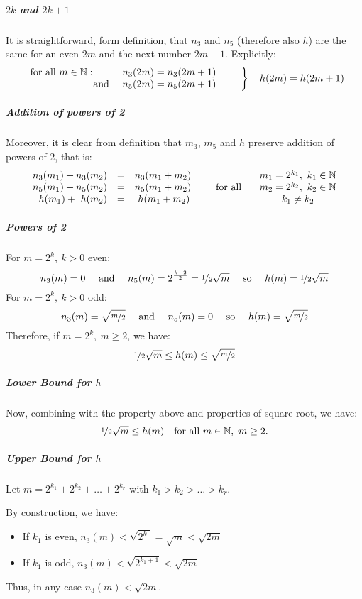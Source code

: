 \subparagraph{$2k$ and $2k+1$}
It is straightforward, form definition, that $n_3$ and $n_5$ (therefore also $h$) are the same for an even $2m$ and the next number $2m+1$.
Explicitly:
$$
\left. 
\begin{array}{rc}
	\text{for all } m \in \mathbb{N}: \qquad & n_3(2m) = n_3(2m+1) \\
	\text{ and } & n_5(2m) = n_5(2m+1) \\
\end{array} 
\qquad \right\rbrace \quad h(2m) = h(2m+1)
$$

\subparagraph{Addition of powers of 2}
Moreover, it is clear from definition that $m_3$, $m_5$ and $h$ preserve addition of powers of 2, that is:
$$
\begin{array}{rcl}
	n_3(m_1) + n_3(m_2) &=& n_3(m_1+m_2) \\
	n_5(m_1) + n_5(m_2) &=& n_5(m_1+m_2) \\
	  h(m_1) + \ h(m_2) &=& \ h(m_1+m_2) \\
\end{array}
\qquad \text{for all } \quad
\begin{array}{c}
	m_1=2^{k_1}, \ k_1 \in \mathbb{N} \\
	m_2=2^{k_2}, \ k_2 \in \mathbb{N} \\
	k_1 \neq k_2
\end{array}
$$

\subparagraph{Powers of 2}
For $m=2^k, \ k>0$ even: 
$$
n_3(m) = 0 
\quad \text{ and } \quad 
n_5(m) = 2^{\frac{k-2}{2}} = \nicefrac{1}{2}\sqrt{m}
\quad \text{ so } \quad 
h(m) = \nicefrac{1}{2}\sqrt{m} 
$$
For $m=2^k, \ k>0$ odd: 
$$
n_3(m) = \sqrt{\nicefrac{m}{2}}
\quad \text{ and } \quad 
n_5(m) = 0
\quad \text{ so } \quad 
h(m) = \sqrt{\nicefrac{m}{2}}
$$
Therefore, if $m=2^k, \ m \geq 2$, we have:
$$
\nicefrac{1}{2}\sqrt{m} \leq h(m) \leq \sqrt{\nicefrac{m}{2}}
$$

\subparagraph{Lower Bound for $h$}
Now, combining with the property above and properties of square root, we have:
$$
\nicefrac{1}{2}\sqrt{m} \leq h(m) \quad \text{for all } m \in \mathbb{N}, \ m \geq 2.
$$

\subparagraph{Upper Bound for $h$}
Let $m = 2^{k_1} + 2^{k_2} + \dots + 2^{k_r}$ with $k_1 > k_2 > \dots > k_r$.

By construction, we have:
\begin{itemize}
	\item If $k_1$ is even, $n_3(m) < \sqrt{2^{k_1}} = \sqrt{m} < \sqrt{2m}$
	\item If $k_1$ is odd, $n_3(m) < \sqrt{2^{k_1+1}} < \sqrt{2m}$
\end{itemize}
Thus, in any case $n_3(m) < \sqrt{2m}$.

